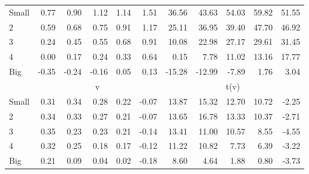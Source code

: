 \begin{table}[!ht]
\begin{tabular}{lrrrrrrrrrr}
    \\
      \cmidrule(r){2-6} \cmidrule(r){7-11}

    Small   & 0.77  & 0.90  & 1.12  & 1.14  & 1.51  & 36.56  & 43.63  & 54.03  & 59.82  & 51.55  \\
         2  & 0.59  & 0.68  & 0.75  & 0.91  & 1.17  & 25.11  & 36.95  & 39.40  & 47.70  & 46.92  \\
         3  & 0.24  & 0.45  & 0.55  & 0.68  & 0.91  & 10.08  & 22.98  & 27.17  & 29.61  & 31.45  \\
         4  & 0.00  & 0.17  & 0.24  & 0.33  & 0.64  & 0.15  & 7.78  & 11.02  & 13.16  & 17.77  \\
    Big     & -0.35  & -0.24  & -0.16  & 0.05  & 0.13  & -15.28  & -12.99  & -7.89  & 1.76  & 3.04  \\

  
    
      & \multicolumn{5}{c}{v} & \multicolumn{5}{c}{t(v)}
    
    \\
      \cmidrule(r){2-6} \cmidrule(r){7-11}

    Small   & 0.31  & 0.34  & 0.28  & 0.22  & -0.07  & 13.87  & 15.32  & 12.70  & 10.72  & -2.25  \\
         2  & 0.34  & 0.33  & 0.27  & 0.21  & -0.07  & 13.65  & 16.78  & 13.33  & 10.37  & -2.71  \\
         3  & 0.35  & 0.23  & 0.23  & 0.21  & -0.14  & 13.41  & 11.00  & 10.57  & 8.55  & -4.55  \\
         4  & 0.32  & 0.25  & 0.18  & 0.17  & -0.12  & 11.22  & 10.82  & 7.73  & 6.39  & -3.22  \\
    Big     & 0.21  & 0.09  & 0.04  & 0.02  & -0.18  & 8.60  & 4.64  & 1.88  & 0.80  & -3.73  \\

  

  \bottomrule
\end{tabular}
\label{tbl:25_Size_Beta_F93}
\end{table}